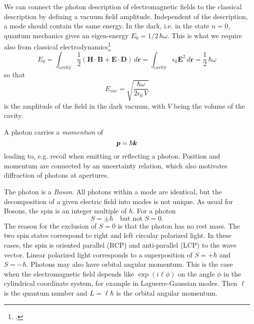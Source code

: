 We can connect the photon description of electromagnetic fields to the classical description by defining a vacuum field amplitude. Independent of the description, a mode should contain the same energy. In the dark, i.e. in the state $n=0$, quantum mechanics gives an eigen-energy $E_0 = 1/2 \,  \hbar \omega$. This is what we require also from classical electrodynamics\footcite[chap. 7.5]{Fox}
\begin{equation}
E_0 = 
 \int_\text{cavity} \frac{1}{2} 
 \left( \boldsymbol{H} \cdot  \boldsymbol{B} + \boldsymbol{E} \cdot  \boldsymbol{D} \right) \, d\boldsymbol{r} = 
  \int_\text{cavity}  \epsilon_0 \boldsymbol{E}^2 \, d\boldsymbol{r} = \frac{1}{2} \, \hbar \omega
\end{equation}
so that
\begin{equation}
E_{vac} = \sqrt{\frac{\hbar \omega}{2 \epsilon_0 \, V}} \label{eq:8_evac}
\end{equation}
is the amplitude of the field in the dark vacuum, with $V$ being the volume of the cavity. 

A photon carries a \emph{momentum} of 
\begin{equation}
    \boldsymbol{p} = \hbar \boldsymbol{k}
\end{equation}
leading to, e.g. recoil when emitting or reflecting a photon. Position and momentum are connected by an uncertainty relation, which also motivates diffraction of photons at apertures.

The photon is a \emph{Boson}. All photons within a mode are identical, but  the decomposition of a given electric field into modes is not unique. As usual for Bosons, the spin is an integer multiple of $\hbar$. For a photon
\begin{equation}
    S = \pm \hbar \quad \text{but not } S = 0.
\end{equation}
The reason for the exclusion of $S=0$ is that the photon has no rest mass. The two spin states correspond to right and left circular polarized light. In these cases, the spin is oriented parallel (RCP) and anti-parallel (LCP) to the wave vector. Linear polarized light corresponds to a superposition of $S=+\hbar$ and $S=-\hbar$. Photons may also have orbital angular momentum. This is the case when the electromagnetic field depends like $\exp(i \ell \phi)$ on the angle $\phi$ in the cylindrical coordinate system, for example in Laguerre-Gaussian modes. Then $\ell$ is the quantum number and $L = \ell  \hbar$ is the orbital angular momentum.


